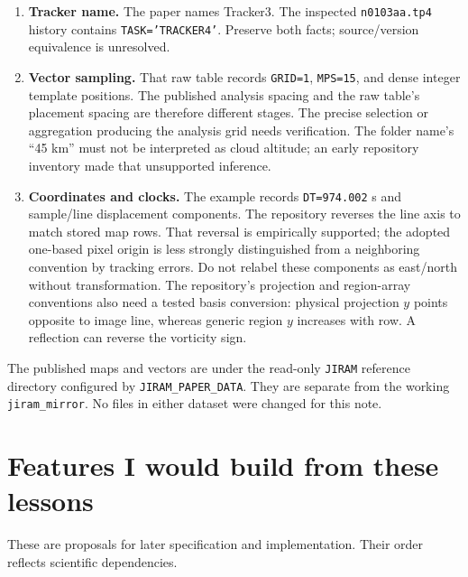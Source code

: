 \documentclass[11pt]{article}
\begin{document}
\begin{enumerate}
 \item \textbf{Tracker name.} The paper names Tracker3. The inspected
 \texttt{n0103aa.tp4} history contains \texttt{TASK='TRACKER4'}.
 Preserve both facts; source/version equivalence is unresolved.
 \item \textbf{Vector sampling.} That raw table records \texttt{GRID=1},
 \texttt{MPS=15}, and dense integer template positions. The published
 analysis spacing and the raw table's placement spacing are therefore
 different stages. The precise selection or aggregation producing the
 analysis grid needs verification. The folder name's ``45 km'' must not
 be interpreted as cloud altitude; an early repository inventory made
 that unsupported inference.
 \item \textbf{Coordinates and clocks.} The example records
 \texttt{DT=974.002} s and sample/line displacement components. The
 repository reverses the line axis to match stored map rows. That reversal
 is empirically supported; the adopted one-based pixel origin is less
 strongly distinguished from a neighboring convention by tracking errors.
 Do not relabel these components as east/north without transformation.
 The repository's projection and region-array conventions also need a
 tested basis conversion: physical projection $y$ points opposite to image
 line, whereas generic region $y$ increases with row. A reflection can
 reverse the vorticity sign.
\end{enumerate}

The published maps and vectors are under the read-only \texttt{JIRAM}
reference directory configured by \texttt{JIRAM\_PAPER\_DATA}. They are
separate from the working \texttt{jiram\_mirror}. No files in either dataset
were changed for this note.

\section{Features I would build from these lessons}\label{sec:features}

These are proposals for later specification and implementation. Their order
reflects scientific dependencies.
\end{document}
